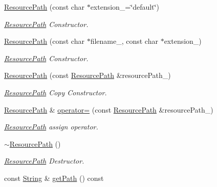 \begin{DoxyCompactItemize}
\item 
\hyperlink{class_i_dream_sky_1_1_resource_path_afe366e99a3174e71001030b184d1cdb9}{Resource\+Path} (const char $\ast$extension\+\_\+=\char`\"{}default\char`\"{})
\begin{DoxyCompactList}\small\item\em \hyperlink{class_i_dream_sky_1_1_resource_path}{Resource\+Path} Constructor. \end{DoxyCompactList}\item 
\hyperlink{class_i_dream_sky_1_1_resource_path_a23b8bc053eb524173a418d3e99aae6c8}{Resource\+Path} (const char $\ast$filename\+\_\+, const char $\ast$extension\+\_\+)
\begin{DoxyCompactList}\small\item\em \hyperlink{class_i_dream_sky_1_1_resource_path}{Resource\+Path} Constructor. \end{DoxyCompactList}\item 
\hyperlink{class_i_dream_sky_1_1_resource_path_a20d3c0ee3b90dd65ee89bec71783128f}{Resource\+Path} (const \hyperlink{class_i_dream_sky_1_1_resource_path}{Resource\+Path} \&resource\+Path\+\_\+)
\begin{DoxyCompactList}\small\item\em \hyperlink{class_i_dream_sky_1_1_resource_path}{Resource\+Path} Copy Constructor. \end{DoxyCompactList}\item 
\hyperlink{class_i_dream_sky_1_1_resource_path}{Resource\+Path} \& \hyperlink{class_i_dream_sky_1_1_resource_path_a6293f188262d023721ea37badc4f8b97}{operator=} (const \hyperlink{class_i_dream_sky_1_1_resource_path}{Resource\+Path} \&resource\+Path\+\_\+)
\begin{DoxyCompactList}\small\item\em \hyperlink{class_i_dream_sky_1_1_resource_path}{Resource\+Path} assign operator. \end{DoxyCompactList}\item 
\hyperlink{class_i_dream_sky_1_1_resource_path_a5f846f67f5dfbd8941227e084418afcd}{$\sim$\+Resource\+Path} ()
\begin{DoxyCompactList}\small\item\em \hyperlink{class_i_dream_sky_1_1_resource_path}{Resource\+Path} Destructor. \end{DoxyCompactList}\item 
const \hyperlink{class_i_dream_sky_1_1_string}{String} \& \hyperlink{class_i_dream_sky_1_1_resource_path_a007f883763459950a0793219b353341f}{get\+Path} () const 

\end{DoxyCompactItemize}
